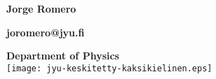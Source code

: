 \begin{titlepage}
	
    \begin{center}
        
        \Large{\textbf{}}\\
        \vspace{0.15\textheight}
        \Huge{\textbf{}}\\
        \vspace{0.05\textheight}
      \Large{\textbf{Jorge Romero}}
      
      \large{\textbf{{joromero@jyu.fi}}}
    
 \vfill
        \large{\textbf{Department of Physics}}\\
   \vspace{1em}
    \texttt{[image: jyu-keskitetty-kaksikielinen.eps]}
    \end{center}
\end{titlepage}